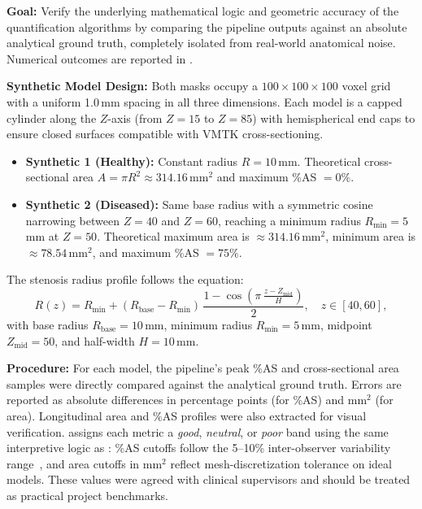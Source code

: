\textbf{Goal:} Verify the underlying mathematical logic and geometric accuracy of the quantification algorithms by comparing the pipeline outputs against an absolute analytical ground truth, completely isolated from real-world anatomical noise. Numerical outcomes are reported in .

\textbf{Synthetic Model Design:} Both masks occupy a $100 \times 100 \times 100$ voxel grid with a uniform 1.0\,mm spacing in all three dimensions. Each model is a capped cylinder along the $Z$-axis (from $Z = 15$ to $Z = 85$) with hemispherical end caps to ensure closed surfaces compatible with VMTK cross-sectioning.

\begin{itemize}
  \item \textbf{Synthetic 1 (Healthy):} Constant radius $R = 10$\,mm. Theoretical cross-sectional area $A = \pi R^2 \approx 314.16$\,mm$^2$ and maximum \%AS $= 0\%$.
  \item \textbf{Synthetic 2 (Diseased):} Same base radius with a symmetric cosine narrowing between $Z = 40$ and $Z = 60$, reaching a minimum radius $R_{\min} = 5$\,mm at $Z = 50$. Theoretical maximum area is $\approx 314.16$\,mm$^2$, minimum area is $\approx 78.54$\,mm$^2$, and maximum \%AS $= 75\%$.
\end{itemize}

The stenosis radius profile follows the equation:
\begin{equation}
  R(z) = R_{\min} + (R_{\mathrm{base}} - R_{\min})\,\frac{1 - \cos\!\left(\pi\,\frac{z - Z_{\mathrm{mid}}}{H}\right)}{2},
  \quad z \in [40, 60],
  \label{eq:synthetic-radius}
\end{equation}
with base radius $R_{\mathrm{base}} = 10$\,mm, minimum radius $R_{\min} = 5$\,mm, midpoint $Z_{\mathrm{mid}} = 50$, and half-width $H = 10$\,mm.

\textbf{Procedure:} For each model, the pipeline's peak \%AS and cross-sectional area samples were directly compared against the analytical ground truth. Errors are reported as absolute differences in percentage points (for \%AS) and mm$^2$ (for area). Longitudinal area and \%AS profiles were also extracted for visual verification.  assigns each metric a \emph{good}, \emph{neutral}, or \emph{poor} band using the same interpretive logic as : \%AS cutoffs follow the 5--10\% inter-observer variability range~\cite{hideo_kajita2019}, and area cutoffs in mm$^2$ reflect mesh-discretization tolerance on ideal models. These values were agreed with clinical supervisors and should be treated as practical project benchmarks.

